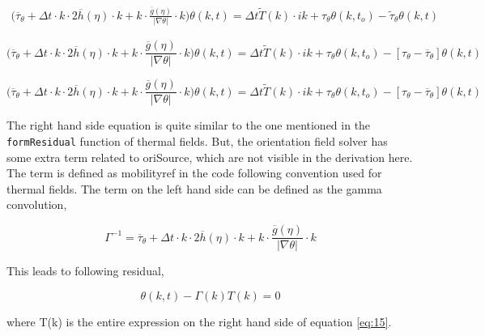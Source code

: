 \documentclass[a4paper,11pt,dvipsnames]{article}
\begin{document}
\begin{multline}
\biggl ( \overline{\tau}_\theta + \Delta t \cdot k \cdot 2 \overline{h} (\eta) \cdot k 
+ k \cdot \frac{\overline{g}(\eta)}{\left | \nabla \theta \right |} \cdot k \biggr ) \theta (k,t) = 
\Delta t \tilde{T}(k) \cdot ik + \tau_\theta \theta (k,t_o) - \tilde{\tau}_\theta \theta (k,t) \label{eq:16}
\end{multline}

\begin{equation}
\biggl ( \overline{\tau}_\theta + \Delta t \cdot k \cdot 2 \overline{h} (\eta) \cdot k 
+ k \cdot \frac{\overline{g}(\eta)}{\left | \nabla \theta \right |} \cdot k \biggr ) \theta (k,t) = 
\Delta t \tilde{T}(k) \cdot ik + \tau_\theta \theta (k,t_o) - 
\left [ \tau_\theta - \overline{\tau}_\theta \right ] \theta (k,t) \label{eq:17}
\end{equation}

\begin{equation}
\biggl ( \overline{\tau}_\theta + \Delta t \cdot k \cdot 2 \overline{h} (\eta) \cdot k 
+ k \cdot \frac{\overline{g}(\eta)}{\left | \nabla \theta \right |} \cdot k \biggr ) \theta (k,t) = 
\Delta t \tilde{T}(k) \cdot ik + \tau_\theta \theta (k,t_o) - 
\left [ \tau_\theta - \overline{\tau}_\theta \right ] \theta (k,t) \label{eq:18}
\end{equation}

The right hand side equation is quite similar to the one mentioned in the \verb|formResidual| function of thermal fields. 
But, the orientation field solver has some extra term related to oriSource, which are not visible in the derivation here. 
The term  is defined as mobility\textunderscore ref in the code following convention used 
for thermal fields. 
The term on the left hand side can be defined as the gamma convolution, 

\begin{equation}
    \Gamma^{-1} = \overline{\tau}_\theta + \Delta t \cdot k \cdot 2 \overline{h} (\eta) \cdot k 
    + k \cdot \frac{\overline{g}(\eta)}{\left | \nabla \theta \right |} \cdot k \label{eq:19}
\end{equation}

This leads to following residual, 

\begin{equation}
    \theta (k,t) - \Gamma (k) T(k) = 0 \label{eq:20}
\end{equation}

where T(k) is the entire expression on the right hand side of equation \ref{eq:15}. 




\end{document}
